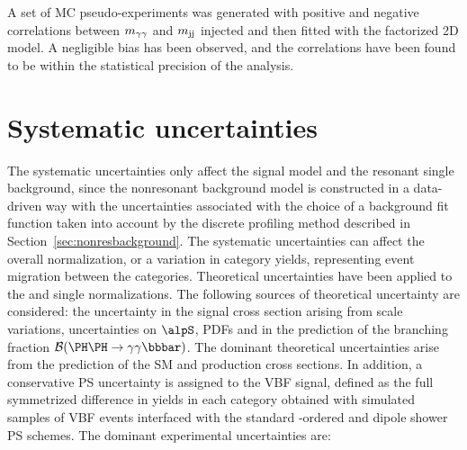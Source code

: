 \documentclass[11pt,twoside,a4paper,cmspaper,final,collab]{cms-tdr}
\begin{document}
A set of MC pseudo-experiments was generated with positive and negative correlations between $m_{\gamma\gamma}$ and $m_\text{jj}$ injected and then fitted with the factorized 2D model. A negligible bias has been observed, and the correlations have been found to be within the statistical precision of the analysis.

\section{Systematic uncertainties}
\label{sec:syst}
The systematic uncertainties only affect the signal model
 and the resonant single \PH background, since the nonresonant background model is constructed in a data-driven way with the
 uncertainties associated with the choice of a background fit function taken into account by the discrete profiling method described
 in Section~\ref{sec:nonresbackground}. The systematic uncertainties can affect the overall normalization, or a variation in category yields, representing event migration between the categories. Theoretical uncertainties have been applied to the \HH and single \PH normalizations. The following sources of theoretical uncertainty are considered: the uncertainty in the signal cross section arising from scale variations, uncertainties on $\alpS$, PDFs and in the prediction of the branching fraction $\mathcal{B}(\HH\to\bbgg)$. 
 The dominant theoretical uncertainties arise from the prediction of the SM \HH and \ttH production cross sections. 
In addition, a conservative PS uncertainty is assigned to the VBF \HH signal, defined as the full symmetrized difference in yields in each category obtained with simulated samples of VBF \HH events interfaced with the standard \pt-ordered and dipole shower PS schemes. 
The dominant experimental uncertainties are:
\end{document}
